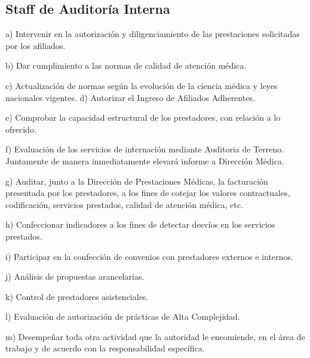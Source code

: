 \subsection{Staff de Auditoría Interna}
\begin{displayquote}
a) Intervenir en la autorización y diligenciamiento de las prestaciones solicitadas por los afiliados.

b) Dar cumplimiento a las normas de calidad de atención médica.

c) Actualización de normas según la evolución de la ciencia médica y leyes nacionales vigentes.
d) Autorizar el Ingreso de Afiliados Adherentes.

e) Comprobar la capacidad estructural de los prestadores, con relación a lo ofrecido.

f) Evaluación de los servicios de internación mediante Auditoria de Terreno. Juntamente de manera inmediatamente elevará informe a Dirección Médica.

g) Auditar, junto a la Dirección de Prestaciones Médicas, la facturación presentada por los prestadores, a los fines de cotejar los valores contractuales, codificación, servicios prestados, calidad de atención médica, etc.

h) Confeccionar indicadores a los fines de detectar desvíos en los servicios prestados.

i) Participar en la confección de convenios con prestadores externos e internos.

j) Análisis de propuestas arancelarias.

k) Control de prestadores asistenciales.

l) Evaluación de autorización de prácticas de Alta Complejidad.

m) Desempeñar toda otra actividad que la autoridad le encomiende, en el área de trabajo y de acuerdo con la responsabilidad específica.
\hfill\parencite{CSOrd17}
\end{displayquote}

